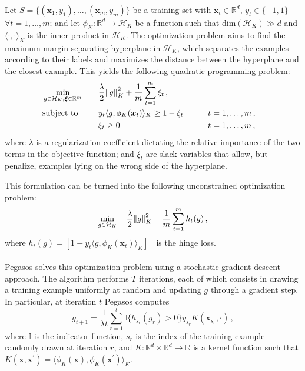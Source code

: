 \documentclass[runningheads]{llncs}
\begin{document}
Let $S = \{(\bm{x}_1,y_1),\dots,(\bm{x}_m,y_m)\}$ be a training set with $\bm{x}_t \in \mathbb{R}^d, \, y_t \in \{-1, 1\}$ $\forall t=1,\dots,m$; and let $\phi_K : \mathbb{R}^d \to \mathcal{H}_K$ be a function such that $\text{dim}(\mathcal{H}_K) \gg d$ and $\langle \cdot , \cdot \rangle_K$ is the inner product in $\mathcal{H}_K$. The optimization problem aims to find the maximum margin separating hyperplane in $\mathcal{H}_K$, which separates the examples according to their labels and maximizes the distance between the hyperplane and the closest example. This yields the following quadratic programming problem: 
\begin{alignat}{3}
  &\min_{g \in \mathcal{H}_K, \bm{\xi} \in \mathbb{R}^m} & \quad & \frac{\lambda}{2} \norm{g}_K^2 + \frac{1}{m}\sum_{t=1}^{m} \xi_t \, , \notag\\
  &\text{subject to}  &       & y_t \langle g, \phi_K(\bm{x}_t) \rangle_K \geq 1 - \xi_t &\qquad& t = 1,\dots,m \, , \notag\\
  &                   &       & \xi_t \geq 0  &\qquad& t = 1,\dots,m \, , \notag
\end{alignat}
where $\lambda$ is a regularization coefficient dictating the relative importance of the two terms in the objective function; and $\xi_t$ are slack variables that allow, but penalize, examples lying on the wrong side of the hyperplane.

This formulation can be turned into the following unconstrained optimization problem:
\[
  \min_{g \in \mathcal{H}_K} \quad \frac{\lambda}{2} \norm{g}_K^2 + \frac{1}{m}\sum_{t=1}^{m} h_t(g) \, ,
\]
where $h_t(g) = [1 - y_t\langle g, \phi_K(\bm{x}_t) \rangle_K]_+$ is the hinge loss.

Pegasos solves this optimization problem using a stochastic gradient descent approach. The algorithm performs $T$ iterations, each of which consists in drawing a training example uniformly at random and updating $g$ through a gradient step. In particular, at iteration $t$ Pegasos computes
\begin{equation}
  g_{t+1} = \frac{1}{\lambda t} \sum_{r = 1}^{t} \mathbb{I}\{h_{s_r}(g_r) > 0\} y_{s_r} K(\bm{x}_{s_r}, \cdot) \, , \label{eqn:pegasos:g}
\end{equation}
where $\mathbb{I}$ is the indicator function, $s_r$ is the index of the training example randomly drawn at iteration $r$, and $K : \mathbb{R}^d \times \mathbb{R}^d \to \mathbb{R}$ is a kernel function such that $K(\bm{x},\bm{x}^\prime) = \langle \phi_K(\bm{x}), \phi_K(\bm{x}^\prime) \rangle_K$.
\end{document}
